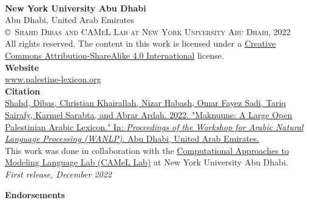 \documentclass[11pt]{book}
\begin{document}

\newpage
~\vfill
\thispagestyle{empty}


\noindent \textbf{New York University Abu Dhabi}\\
\noindent Abu Dhabi, United Arab Emirates\\

\copyright\ \textsc{Shahd Dibas and CAMeL Lab at New York University Abu Dhabi, 2022}\\
All rights reserved. The content in this work is licensed under a \href{https://creativecommons.org/licenses/by-sa/4.0/}{Creative Commons Attribution-ShareAlike 4.0 International} license. \\

\textbf{Website}\\
\noindent \url{www.palestine-lexicon.org}\\ %

\textbf{Citation}\\
\href{https://arxiv.org/abs/2210.12985}{Shahd, Dibas, Christian Khairallah, Nizar Habash, Omar Fayez Sadi, Tariq Sairafy, Karmel Sarabta, and Abrar Ardah. 2022. "Maknuune: A Large Open Palestinian Arabic Lexicon." In: \textit{Proceedings of the Workshop for Arabic Natural Language Processing (WANLP)}. Abu Dhabi, United Arab Emirates.} \\

\noindent This work was done in collaboration with the \href{https://nyuad.nyu.edu/en/research/faculty-labs-and-projects/computational-approaches-to-modeling-language-lab.html}{Computational Approaches to Modeling Language Lab (CAMeL Lab)} at New York University Abu Dhabi.\\ %

\noindent \textit{First release, December 2022} %


\newpage
\thispagestyle{empty}
{\par\normalfont\fontsize{30}{30}\selectfont \textbf{Endorsements}} \\
\vspace{2cm}
\end{document}
